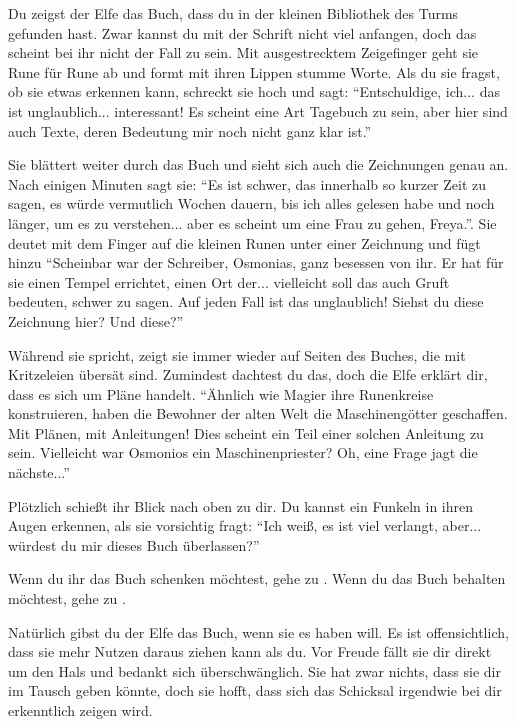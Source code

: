 
Du zeigst der Elfe das Buch, dass du in der kleinen Bibliothek des Turms gefunden hast. Zwar kannst du mit der Schrift nicht viel anfangen, doch das scheint bei ihr nicht der Fall zu sein. Mit ausgestrecktem Zeigefinger geht sie Rune für Rune ab und formt mit ihren Lippen stumme Worte.
Als du sie fragst, ob sie etwas erkennen kann, schreckt sie hoch und sagt: ``Entschuldige, ich... das ist unglaublich... interessant! Es scheint eine Art Tagebuch zu sein, aber hier sind auch Texte, deren Bedeutung mir noch nicht ganz klar ist.''

Sie blättert weiter durch das Buch und sieht sich auch die Zeichnungen genau an. Nach einigen Minuten sagt sie: ``Es ist schwer, das innerhalb so kurzer Zeit zu sagen, es würde vermutlich Wochen dauern, bis ich alles gelesen habe und noch länger, um es zu verstehen... aber es scheint um eine Frau zu gehen, Freya.''.
Sie deutet mit dem Finger auf die kleinen Runen unter einer Zeichnung und fügt hinzu ``Scheinbar war der Schreiber, Osmonias, ganz besessen von ihr. Er hat für sie einen Tempel errichtet, einen Ort der... vielleicht soll das auch Gruft bedeuten, schwer zu sagen. Auf jeden Fall ist das unglaublich! Siehst du diese Zeichnung hier? Und diese?''

Während sie spricht, zeigt sie immer wieder auf Seiten des Buches, die mit Kritzeleien übersät sind. Zumindest dachtest du das, doch die Elfe erklärt dir, dass es sich um Pläne handelt.
``Ähnlich wie Magier ihre Runenkreise konstruieren, haben die Bewohner der alten Welt die Maschinengötter geschaffen.
Mit Plänen, mit Anleitungen! Dies scheint ein Teil einer solchen Anleitung zu sein. Vielleicht war Osmonios ein Maschinenpriester? Oh, eine Frage jagt die nächste...''

Plötzlich schießt ihr Blick nach oben zu dir. Du kannst ein Funkeln in ihren Augen erkennen, als sie vorsichtig fragt: ``Ich weiß, es ist viel verlangt, aber... würdest du mir dieses Buch überlassen?''

Wenn du ihr das Buch schenken möchtest, gehe zu . Wenn du das Buch behalten möchtest, gehe zu .


Natürlich gibst du der Elfe das Buch, wenn sie es haben will. Es ist offensichtlich, dass sie mehr Nutzen daraus ziehen kann als du. Vor Freude fällt sie dir direkt um den Hals und bedankt sich überschwänglich. Sie hat zwar nichts, dass sie dir im Tausch geben könnte, doch sie hofft, dass sich das Schicksal irgendwie bei dir erkenntlich zeigen wird.


